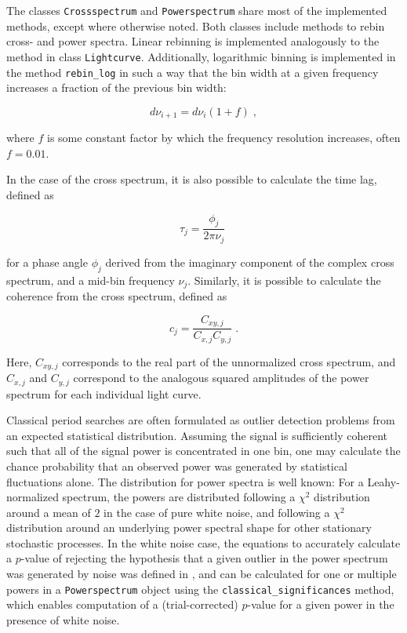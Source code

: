 \documentclass[twocolumn]{aastex62}
\newcommand{\lightcurve}{\texttt{Lightcurve}\xspace}
\newcommand{\crossspectrum}{\texttt{Crossspectrum}\xspace}
\newcommand{\powerspectrum}{\texttt{Powerspectrum}\xspace}
\begin{document}
The classes \crossspectrum and \powerspectrum share most of the implemented methods, except where otherwise noted. Both classes include methods to rebin cross- and power spectra. Linear rebinning is implemented analogously to the method in class \lightcurve. Additionally, logarithmic binning is implemented in the method \texttt{rebin_log} in such a way that the bin width at a given frequency increases a fraction of the previous bin width:

\[
d\nu_{i+1} = d\nu_{i} (1 + f) \; ,
\]

\noindent where $f$ is some constant factor by which the frequency resolution increases, often $f = 0.01$. 

In the case of the cross spectrum, it is also possible to calculate the time lag, defined as

\[
\tau_j = \frac{\phi_j}{2\pi\nu_j} \; 
\]

\noindent for a phase angle $\phi_j$ derived from the imaginary component of the complex cross spectrum, and a mid-bin frequency $\nu_j$. Similarly, it is possible to calculate the coherence \citep{vaughan1997,nowak1999} from the cross spectrum, defined as 

\begin{equation}
c_j = \frac{C_{xy,j}}{C_{x,j} C_{y,j}} \; . 
\end{equation}

\noindent Here, $C_{xy,j}$ corresponds to the real part of the unnormalized cross spectrum, and $C_{x,j}$ and $C_{y,j}$ correspond to the analogous squared amplitudes of the power spectrum for each individual light curve. 

Classical period searches are often formulated as outlier detection problems from an expected statistical distribution. Assuming the signal is sufficiently coherent such that all of the signal power is concentrated in one bin, one may calculate the chance probability that an observed power was generated by statistical fluctuations alone. The distribution for power spectra is well known: For a Leahy-normalized spectrum, the powers are distributed following a $\chi^2$ distribution around a mean of $2$ in the case of pure white noise, and following a $\chi^2$ distribution around an underlying power spectral shape for other stationary stochastic processes. In the white noise case, the equations to accurately calculate a $p$-value of rejecting the hypothesis that a given outlier in the power spectrum was generated by noise was defined in \citep{Groth1975}, and can be calculated for one or multiple powers in a \powerspectrum object using the \verb|classical_significances| method, which enables computation of a (trial-corrected) $p$-value for a given power in the presence of white noise.%
\end{document}
